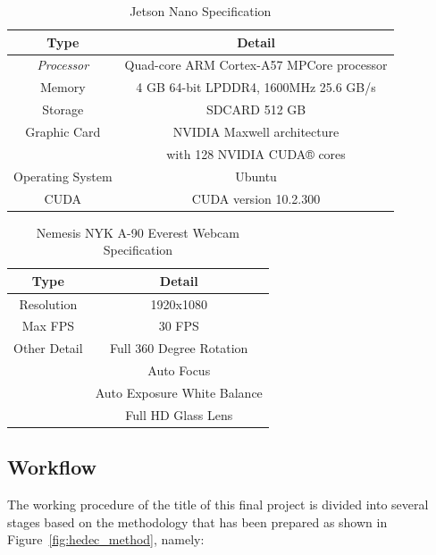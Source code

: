 \begin{table} [ht]
  \caption{Jetson Nano Specification}
  \label{tab:jetsonspec}
  \centering
  \begin{tabular}{|c|c|}
    \hline
    \textbf{Type} & \textbf{Detail}  \\
    \hline
    \textit{Processor} & Quad-core ARM Cortex-A57 MPCore processor \\ 
    Memory             & 4 GB 64-bit LPDDR4, 1600MHz 25.6 GB/s  \\
    Storage            & SDCARD 512 GB\\
    Graphic Card       & NVIDIA Maxwell architecture \\
                      & with 128 NVIDIA CUDA® cores \\
    Operating System   & Ubuntu     \\
    CUDA               & CUDA version 10.2.300    \\              
    \hline
  \end{tabular}
\end{table}

\begin{table} [ht]
  \caption{Nemesis NYK A-90 Everest Webcam Specification}
  \label{tab:nyka90_webcam_spec}
  \centering
  \begin{tabular}{|c|c|}
    \hline
    \textbf{Type} & \textbf{Detail}  \\
    \hline
    Resolution         & 1920x1080 \\ 
    Max FPS            & 30 FPS  \\
    Other Detail       & Full 360 Degree Rotation \\
                        & Auto Focus \\
                        & Auto Exposure White Balance    \\
                      & Full HD Glass Lens    \\              
    \hline
  \end{tabular}
\end{table}

\subsection{Workflow}
\label{subsec:workflow}

\par The working procedure of the title of this final project is divided into several stages based on the methodology that has been prepared as shown in Figure~\ref{fig:hedec_method}, namely: 

